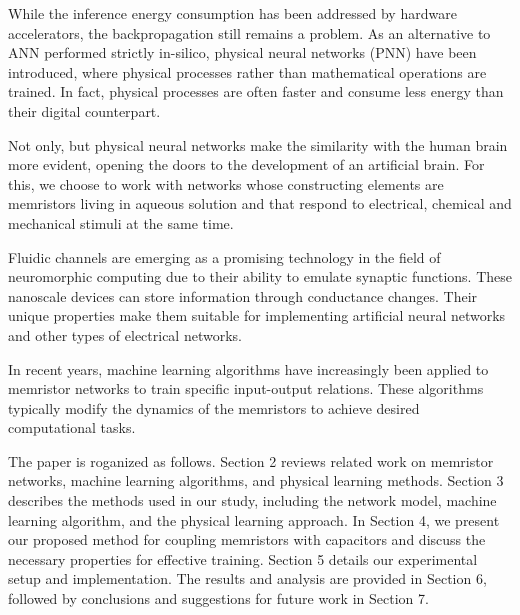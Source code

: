 \documentclass[reprint,superscriptaddress,prb,showkeys]{revtex4-2}
\begin{document}

While the inference energy consumption has been addressed by hardware accelerators, the backpropagation still remains a problem. As an alternative to ANN performed strictly in-silico, physical neural networks (PNN) have been introduced, where physical processes rather than mathematical operations are trained\cite{}. In fact, physical processes are often faster and consume less energy than their digital counterpart. 



Not only, but physical neural networks make the similarity with the human brain more evident, opening the doors to the development of an artificial brain. For this, we choose to work with networks whose constructing elements are memristors living in aqueous solution and that respond to electrical, chemical and mechanical stimuli at the same time.

Fluidic channels are emerging as a promising technology in the field of neuromorphic computing due to their ability to emulate synaptic functions. These nanoscale devices can store information through conductance changes. Their unique properties make them suitable for implementing artificial neural networks and other types of electrical networks.

In recent years, machine learning algorithms have increasingly been applied to memristor networks to train specific input-output relations. These algorithms typically modify the dynamics of the memristors to achieve desired computational tasks.



The paper is roganized as follows. Section 2 reviews related work on memristor networks, machine learning algorithms, and physical learning methods. Section 3 describes the methods used in our study, including the network model, machine learning algorithm, and the physical learning approach. In Section 4, we present our proposed method for coupling memristors with capacitors and discuss the necessary properties for effective training. Section 5 details our experimental setup and implementation. The results and analysis are provided in Section 6, followed by conclusions and suggestions for future work in Section 7.
\end{document}
